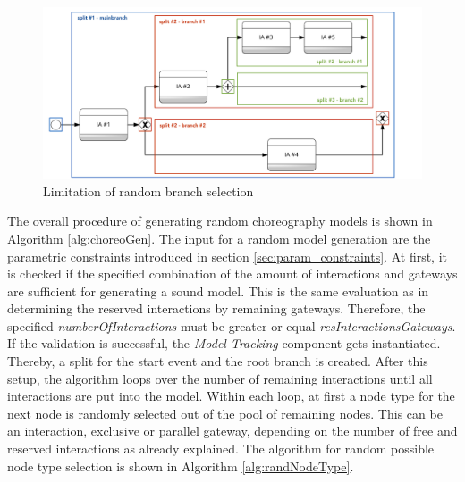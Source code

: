 \begin{figure}[]
\includegraphics[width=1\textwidth]{src/images/choreo_branch_status.png}
\caption{Limitation of random branch selection}
\label{fig:graphTracking3}
\end{figure}
\vspace{-0.25cm}
The overall procedure of generating random choreography models is shown in Algorithm \ref{alg:choreoGen}. The input for a random model generation are the parametric constraints introduced in section \ref{sec:param_constraints}. At first, it is checked if the specified combination of the amount of interactions and gateways are sufficient for generating a sound model. This is the same evaluation as in determining the reserved interactions by remaining gateways. Therefore, the specified \textit{numberOfInteractions} must be greater or equal \textit{resInteractionsGateways}. If the validation is successful, the \textit{Model Tracking} component gets instantiated. Thereby, a split for the start event and the root branch is created. After this setup, the algorithm loops over the number of remaining interactions until all interactions are put into the model. Within each loop, at first a node type for the next node is randomly selected out of the pool of remaining nodes. This can be an interaction, exclusive or parallel gateway, depending on the number of free and reserved interactions as already explained. The algorithm for random possible node type selection is shown in Algorithm \ref{alg:randNodeType}.\\

